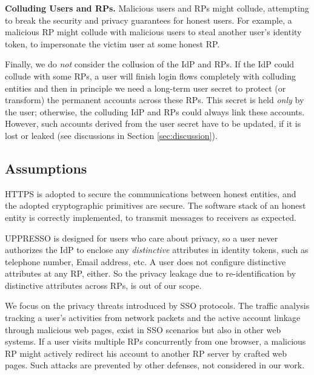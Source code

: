 \noindent \textbf{Colluding Users and RPs.}
Malicious users and RPs might collude,
 attempting to break the security and privacy guarantees for honest users.
For example, a malicious RP might collude with malicious users to steal another user's identity token,
    to impersonate the victim user at some honest RP.

Finally, we do \emph{not} consider the collusion of the IdP and RPs.
    If the IdP could collude with some RPs,
        a user will finish login flows completely with colluding entities
        and then in principle we need a long-term user secret to protect (or transform) the permanent accounts across these RPs.
This secret is held \emph{only} by the user;
    otherwise, the colluding IdP and RPs could always link these accounts.
However, such accounts derived from the user secret have to be updated,
    if it is lost or leaked
    (see discussions in Section \ref{sec:discussion}).

\subsection{Assumptions}
HTTPS is adopted to secure the communications between honest entities,
 and the adopted cryptographic primitives are secure.
The software stack of an honest entity is correctly implemented,
     to transmit messages to receivers as expected.

UPPRESSO is designed for users who care about privacy,
so a user never authorizes the IdP to enclose any \emph{distinctive} attributes in identity tokens,
 such as telephone number, Email address, etc.
A user does not configure  distinctive attributes at any RP, either.
So the privacy leakage due to re-identification by distinctive attributes across RPs,
    is out of our scope.

We focus on the privacy threats introduced by SSO protocols.
The traffic analysis tracking a user's activities from network packets
    and the active account linkage through malicious web pages,
        exist in SSO scenarios but also in other web systems.
If a user visits multiple RPs concurrently from one browser,
        a malicious RP might actively redirect his account to another RP server by crafted web pages.
Such attacks are prevented by other defenses,
    not considered in our work.

